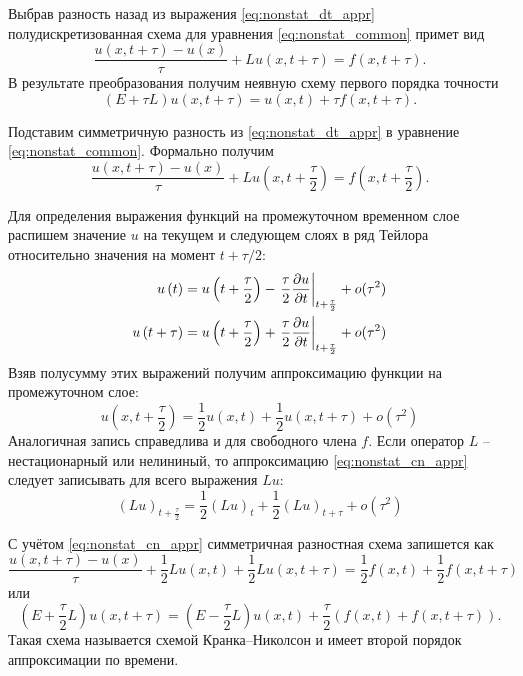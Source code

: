 
Выбрав разность назад из выражения \eqref{eq:nonstat_dt_appr}
полудискретизованная схема для уравнения \eqref{eq:nonstat_common} примет вид
\begin{equation*}
    \frac{u(x, t+\tau) - u(x)}{\tau} + L u(x, t+\tau) = f(x, t+\tau).
\end{equation*}
В результате преобразования получим неявную схему первого порядка точности
\begin{equation}
    \label{eq:nonstat_implicit}
    \left(E+\tau L\right) u(x, t+\tau) = u(x, t) + \tau f(x, t + \tau).
\end{equation}


Подставим симметричную разность из \eqref{eq:nonstat_dt_appr}
в уравнение \eqref{eq:nonstat_common}. Формально получим
\begin{equation*}
    \frac{u(x, t+\tau) - u(x)}{\tau} + L u(x, t+\frac{\tau}{2}) = f(x, t+\frac{\tau}{2}).
\end{equation*}

Для определения выражения функций на промежуточном временном слое
распишем значение $u$ на текущем и следующем слоях в ряд Тейлора
относительно значения на момент $t+\tau/2$:
\begin{align*}
    u\left(t\right)      &= u\left(t+\frac{\tau}{2}\right) - \left.\frac{\tau}{2}\frac{\partial u}{\partial t}\right|_{t+\frac{\tau}{2}} + o(\tau^2)\\
    u\left(t+\tau\right) &= u\left(t+\frac{\tau}{2}\right) + \left.\frac{\tau}{2}\frac{\partial u}{\partial t}\right|_{t+\frac{\tau}{2}} + o(\tau^2)
\end{align*}
Взяв полусумму этих выражений получим аппроксимацию функции на промежуточном слое:
\begin{equation}
    \label{eq:nonstat_cn_appr}
    u\left(x, t + \frac{\tau}{2}\right) = \frac12u\left(x, t\right) + \frac12u\left(x, t+\tau\right) + o(\tau^2)
\end{equation}
Аналогичная запись справедлива и для свободного члена $f$.
Если оператор $L$ -- нестационарный или нелининый, то аппроксимацию \eqref{eq:nonstat_cn_appr}
следует записывать для всего выражения $Lu$:
\begin{equation*}
    \left(Lu\right)_{t+\frac{\tau}{2}} = \frac12\left(Lu\right)_{t} + \frac12\left(Lu\right)_{t+\tau} + o(\tau^2)
\end{equation*}


С учётом \eqref{eq:nonstat_cn_appr} симметричная разностная схема
запишется как
\begin{equation*}
    \frac{u(x, t+\tau) - u(x)}{\tau} + \frac12L u(x, t) + \frac12 L u(x, t + \tau) = \frac12 f(x, t) + \frac12 f(x, t+\tau)
\end{equation*}
или
\begin{equation}
    \label{eq:nonstat_cn}
    \left(E+\frac{\tau}{2} L\right) u(x, t+\tau) = \left(E - \frac{\tau}{2} L\right) u(x, t) + \frac{\tau}{2} \left(f(x, t) + f(x, t + \tau)\right).
\end{equation}
Такая схема называется схемой Кранка--Николсон и имеет второй порядок аппроксимации по времени.

